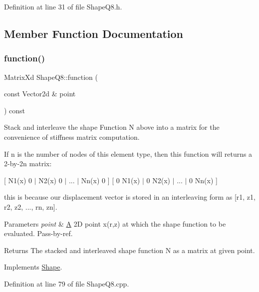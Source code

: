 Definition at line 31 of file Shape\+Q8.\+h.



\subsection{Member Function Documentation}
\mbox{\label{class_shape_q8_a7e859a85ee52c8d3ab3051326fc09ab0}} 
\subsubsection{\texorpdfstring{function()}{function()}}
{\footnotesize\ttfamily Matrix\+Xd Shape\+Q8\+::function (\begin{DoxyParamCaption}\item[{const Vector2d \&}]{point }\end{DoxyParamCaption}) const\hspace{0.3cm}{\ttfamily [virtual]}}



Stack and interleave the shape Function N above into a matrix for the convenience of stiffness matrix computation. 

If n is the number of nodes of this element type, then this function will returns a 2-\/by-\/2n matrix\+:

\mbox{[} N1(x) 0 $\vert$ N2(x) 0 $\vert$ ... $\vert$ Nn(x) 0 \mbox{]} \mbox{[} 0 N1(x) $\vert$ 0 N2(x) $\vert$ ... $\vert$ 0 Nn(x) \mbox{]}

this is because our displacement vector is stored in an interleaving form as \mbox{[}r1, z1, r2, z2, ..., rn, zn\mbox{]}.


\begin{DoxyParams}{Parameters}
{\em point} & \mbox{\hyperlink{class_a}{A}} 2D point x(r,z) at which the shape function to be evaluated. Pass-\/by-\/ref. \\
\hline
\end{DoxyParams}
\begin{DoxyReturn}{Returns}
The stacked and interleaved shape function N as a matrix at given point. 
\end{DoxyReturn}


Implements \mbox{\hyperlink{class_shape_ab6e0d64b40e09c176ce2ece24bc94a37}{Shape}}.



Definition at line 79 of file Shape\+Q8.\+cpp.


